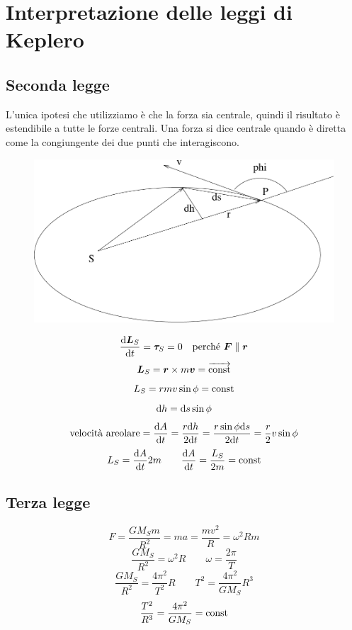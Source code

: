 \section{Interpretazione delle leggi di Keplero}
\subsection{Seconda legge}

L'unica ipotesi che utilizziamo è che la forza sia centrale,
quindi il risultato è estendibile a tutte le forze centrali. Una
forza si dice centrale quando è diretta come la congiungente dei
due punti che interagiscono.

\begin{figure}[htbp]
   \centering
   \includegraphics[scale=0.45]{immagini/fisica1/keplero}
\end{figure}



\[
\frac{\mathrm{d}\boldsymbol{L}_S}{\mathrm{d} t}=\boldsymbol{\tau}_S=0\quad\text{perché }\boldsymbol{F}\parallel\boldsymbol{r}
\]
\begin{equation*}\boldsymbol{L}_S=\boldsymbol{r}\times m\boldsymbol{v}=\overrightarrow{\text{const}}\end{equation*}
\begin{equation*}L_S=rmv\sin\phi={\text{const}}\end{equation*}
\begin{equation*}\mathrm{d} h=\mathrm{d} s\sin\phi\end{equation*}
\[
\text{velocità areolare}=\frac{\mathrm{d} A}{\mathrm{d} t}=\frac{r\mathrm{d} h}{2\mathrm{d}
t}=\frac{r\sin\phi\mathrm{d} s}{2\mathrm{d} t}=\frac{r}{2}v\sin\phi
\]
\[L_S=\frac{\mathrm{d} A}{\mathrm{d} t}2m\qquad\frac{\mathrm{d} A}{\mathrm{d}
t}=\frac{L_S}{2m}=\text{const}\]
\subsection{Terza legge}
\begin{equation*}F=\frac{GM_Sm}{R^2}=ma=\frac{mv^2}{R}=\omega^2Rm\end{equation*}
\begin{equation*}\frac{GM_S}{R^2}=\omega^2R\qquad \omega=\frac{2\pi}{T}\end{equation*}
\[\frac{GM_S}{R^2}=\frac{4\pi^2}{T^2}R\qquad
T^2=\frac{4\pi^2}{GM_S}R^3\]
\begin{equation*}\frac{T^2}{R^3}=\frac{4\pi^2}{GM_S}=\text{const}\end{equation*}

